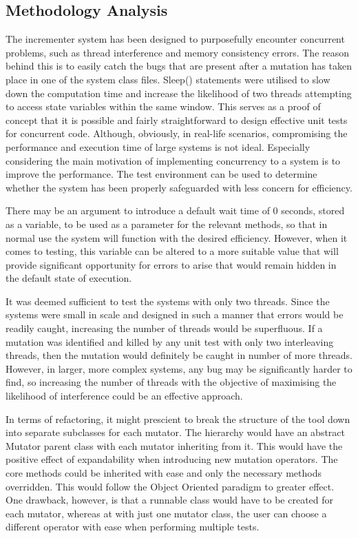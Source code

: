 \documentclass[a4paper,12pt]{article}
\begin{document}
\subsection{Methodology Analysis}



The incrementer system has been designed to purposefully encounter concurrent problems, such as thread interference and memory consistency errors. The reason behind this is to easily catch the bugs that are present after a mutation has taken place in one of the system class files. Sleep() statements were utilised to slow down the computation time and increase the likelihood of two threads attempting to access state variables within the same window. This serves as a proof of concept that it is possible and fairly straightforward to design effective unit tests for concurrent code. Although, obviously, in real-life scenarios, compromising the performance and execution time of large systems is not ideal. Especially considering the main motivation of implementing concurrency to a system is to improve the performance. The test environment can be used to determine whether the system has been properly safeguarded with less concern for efficiency.

There may be an argument to introduce a default wait time of 0 seconds, stored as a variable, to be used as a parameter for the relevant methods, so that in normal use the system will function with the desired efficiency. However, when it comes to testing, this variable can be altered to a more suitable value that will provide significant opportunity for errors to arise that would remain hidden in the default state of execution. 

It was deemed sufficient to test the systems with only two threads. Since the systems were small in scale and designed in such a manner that errors would be readily caught, increasing the number of threads would be superfluous. If a mutation was identified and killed by any unit test with only two interleaving threads, then the mutation would definitely be caught in number of more threads. However, in larger, more complex systems, any bug may be significantly harder to find, so increasing the number of threads with the objective of maximising the likelihood of interference could be an effective approach.

In terms of refactoring, it might prescient to break the structure of the tool down into separate subclasses for each mutator. The hierarchy would have an abstract Mutator parent class with each mutator inheriting from it. This would have the positive effect of expandability when introducing new mutation operators. The core methods could be inherited with ease and only the necessary methods overridden. This would follow the Object Oriented paradigm to greater effect. One drawback, however, is that a runnable class would have to be created for each mutator, whereas at with just one mutator class, the user can choose a different operator with ease when performing multiple tests.
\end{document}
